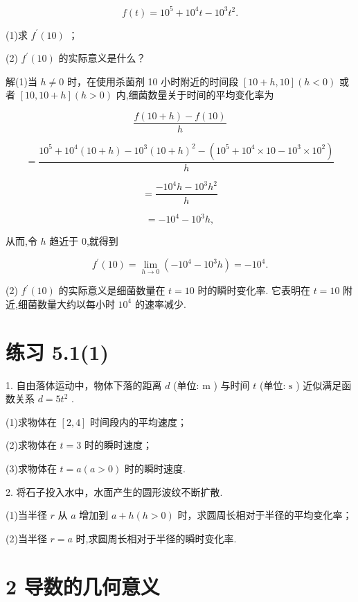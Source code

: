 \documentclass[10pt]{article}
\begin{document}
\[
f\left( t\right)  = {10}^{5} + {10}^{4}t - {10}^{3}{t}^{2}.
\]

(1)求 \({f}^{\prime }\left( {10}\right)\) ；

(2) \({f}^{\prime }\left( {10}\right)\) 的实际意义是什么？

解(1)当 \(h \neq  0\) 时，在使用杀菌剂 10 小时附近的时间段 \(\left\lbrack  {{10} + h,{10}}\right\rbrack  \left( {h < 0}\right)\) 或者 \(\left\lbrack  {{10},{10} + h}\right\rbrack  \left( {h > 0}\right)\) 内,细菌数量关于时间的平均变化率为

\[
\frac{f\left( {{10} + h}\right)  - f\left( {10}\right) }{h}
\]

\[
= \frac{{10}^{5} + {10}^{4}\left( {{10} + h}\right)  - {10}^{3}{\left( {10} + h\right) }^{2} - \left( {{10}^{5} + {10}^{4} \times  {10} - {10}^{3} \times  {10}^{2}}\right) }{h}
\]

\[
= \frac{-{10}^{4}h - {10}^{3}{h}^{2}}{h}
\]

\[
=  - {10}^{4} - {10}^{3}h,
\]

从而,令 \(h\) 趋近于 0,就得到

\[
{f}^{\prime }\left( {10}\right)  = \mathop{\lim }\limits_{{h \rightarrow  0}}\left( {-{10}^{4} - {10}^{3}h}\right)  =  - {10}^{4}.
\]

(2) \({f}^{\prime }\left( {10}\right)\) 的实际意义是细菌数量在 \(t = {10}\) 时的瞬时变化率. 它表明在 \(t = {10}\) 附近,细菌数量大约以每小时 \({10}^{4}\) 的速率减少.

\section*{练习 5.1(1)}

1. 自由落体运动中，物体下落的距离 \(d\) (单位: \(\mathrm{m}\) ) 与时间 \(t\) (单位: \(\mathrm{s}\) ) 近似满足函数关系 \(d = 5{t}^{2}\) .

(1)求物体在 \(\left\lbrack  {2,4}\right\rbrack\) 时间段内的平均速度；

(2)求物体在 \(t = 3\) 时的瞬时速度；

(3)求物体在 \(t = a\left( {a > 0}\right)\) 时的瞬时速度.

2. 将石子投入水中，水面产生的圆形波纹不断扩散.

(1)当半径 \(r\) 从 \(a\) 增加到 \(a + h\left( {h > 0}\right)\) 时，求圆周长相对于半径的平均变化率；

(2)当半径 \(r = a\) 时,求圆周长相对于半径的瞬时变化率.

\section*{2 导数的几何意义}
\end{document}
